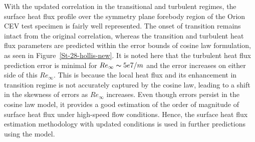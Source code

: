 \documentclass[%
 aip,
 amsmath,amssymb,
preprint,%
]{revtex4-1}
\begin{document}
With the updated correlation in the transitional and turbulent regimes, the surface heat flux profile over the symmetry plane forebody region of the Orion CEV test specimen is fairly well represented. The onset of transition remains intact from the original correlation, whereas the transition and turbulent heat flux parameters are predicted within the error bounds of cosine law formulation, as seen in Figure~\ref{St-28-hollis-new}. It is noted here that the turbulent heat flux prediction error is minimal for $Re_\infty \thicksim 5e7/m$ and the error increases on either side of this $Re_\infty$. This is because the local heat flux and its enhancement in transition regime is not accurately captured by the cosine law, leading to a shift in the skewness of errors as $Re_\infty$ increases. Even though errors persist in the cosine law model, it provides a good estimation of the order of magnitude of surface heat flux under high-speed flow conditions. Hence, the surface heat flux estimation methodology with updated conditions is used in further predictions using the model.


\end{document}
